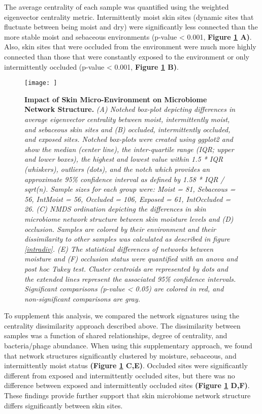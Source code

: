 \documentclass[12pt,]{article}
\begin{document}
The average centrality of each sample was quantified using the weighted
eigenvector centrality metric. Intermittently moist skin sites (dynamic
sites that fluctuate between being moist and dry) were significantly
less connected than the more stable moist and sebaceous environments
(p-value \textless{} 0.001, \textbf{Figure \ref{skinnetwork} A)}. Also,
skin sites that were occluded from the environment were much more highly
connected than those that were constantly exposed to the environment or
only intermittently occluded (p-value \textless{} 0.001, \textbf{Figure
\ref{skinnetwork} B)}.

\begin{figure}[htbp]
\centering
\texttt{[image: ]}
\caption{\textbf{Impact of Skin Micro-Environment on Microbiome Network
Structure.} \emph{(A) Notched box-plot depicting differences in average
eigenvector centrality between moist, intermittently moist, and
sebaceous skin sites and (B) occluded, intermittently occluded, and
exposed sites. Notched box-plots were created using ggplot2 and show the
median (center line), the inter-quartile range (IQR; upper and lower
boxes), the highest and lowest value within 1.5 * IQR (whiskers),
outliers (dots), and the notch which provides an approximate 95\%
confidence interval as defined by 1.58 * IQR / sqrt(n). Sample sizes for
each group were: Moist = 81, Sebaceous = 56, IntMoist = 56, Occluded =
106, Exposed = 61, IntOccluded = 26. (C) NMDS ordination depicting the
differences in skin microbiome network structure between skin moisture
levels and (D) occlusion. Samples are colored by their environment and
their dissimilarity to other samples was calculated as described in
figure \ref{intradiv}. (E) The statistical differences of networks
between moisture and (F) occlusion status were quantified with an anova
and post hoc Tukey test. Cluster centroids are represented by dots and
the extended lines represent the associated 95\% confidence intervals.
Significant comparisons (p-value \textless{} 0.05) are colored in red,
and non-significant comparisons are gray.}\label{skinnetwork}}
\end{figure}

To supplement this analysis, we compared the network signatures using
the centrality dissimilarity approach described above. The dissimilarity
between samples was a function of shared relationships, degree of
centrality, and bacteria/phage abundance. When using this supplementary
approach, we found that network structures significantly clustered by
moisture, sebaceous, and intermittently moist status \textbf{(Figure
\ref{skinnetwork} C,E)}. Occluded sites were significantly different
from exposed and intermittently occluded sites, but there was no
difference between exposed and intermittently occluded sites
\textbf{(Figure \ref{skinnetwork} D,F)}. These findings provide further
support that skin microbiome network structure differs significantly
between skin sites.
\end{document}
